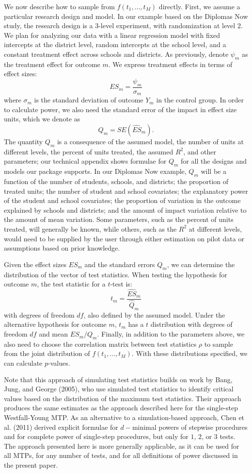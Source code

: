 \documentclass{article}
\begin{document}
We now describe how to sample from \(f(t_1, \dots, t_M)\) directly.
First, we assume a particular research design and model. In our example
based on the Diplomas Now study, the research design is a \(3\)-level
experiment, with randomization at level \(2\). We plan for analyzing our
data with a linear regression model with fixed intercepts at the
district level, random intercepts at the school level, and a constant
treatment effect across schools and districts. As previously, denote
\(\psi_m\) as the treatment effect for outcome \(m\). We express
treatment effects in terms of effect sizes:
\[ES_m = \frac{\psi_m}{\sigma_{m}}\] where \(\sigma_{m}\) is the
standard deviation of outcome \(Y_m\) in the control group. In order to
calculate power, we also need the standard error of the impact in effect
size units, which we denote as \[Q_m = SE(\hat{ES}_m).\] The quantity
\(Q_m\) is a consequence of the assumed model, the number of units at
different levels, the percent of units treated, the assumed \(R^2\), and
other parameters; our technical appendix shows formulae for \(Q_m\) for
all the designs and models our package supports. In our Diplomas Now
example, \(Q_m\) will be a function of the number of students, schools,
and districts; the proportion of treated units; the number of student
and school covariates; the explanatory power of the student and school
covariates; the proportion of variation in the outcome explained by
schools and districts; and the amount of impact variation relative to
the amount of mean variation. Some parameters, such as the percent of
units treated, will generally be known, while others, such as the
\(R^2\) at different levels, would need to be supplied by the user
through either estimation on pilot data or assumptions based on prior
knowledge.

Given the effect sizes \(ES_m\) and the standard errors \(Q_m\), we can
determine the distribution of the vector of test statistics. When
testing the hypothesis for outcome \(m\), the test statistic for a
\(t\)-test is: \[t_m = \frac{\hat{ES}_m}{\hat{Q}_m}\] with degrees of
freedom \(df\), also defined by the assumed model. Under the alternative
hypothesis for outcome \(m\), \(t_m\) has a \(t\) distribution with
degrees of freedom \(df\) and mean \(ES_m/Q_m\). Finally, in addition to
the parameters above, we also need to choose the correlation matrix
between test statistics \(\rho\) to sample from the joint distribution
of \(f(t_1, \dots, t_M)\). With these distributions specified, we can
calculate \(p\)-values.

Note that this approach of simulating test statistics builds on work by
Bang, Jung, and George (2005), who use simulated test statistics to
identify critical values based on the distribution of the maximum test
statistics. Their approach produces the same estimates as the approach
described here for the single-step Westfall-Young MTP. As an alternative
to a simulation-based approach, Chen et al. (2011) derived explicit
formulae for \(d-\)minimal powers of stepwise procedures and for
complete power of single-step procedures, but only for \(1\), \(2\), or
\(3\) tests. The approach presented here is more generally applicable,
as it can be used for all MTPs, for any number of tests, and for all
definitions of power discussed in the present paper.
\end{document}
